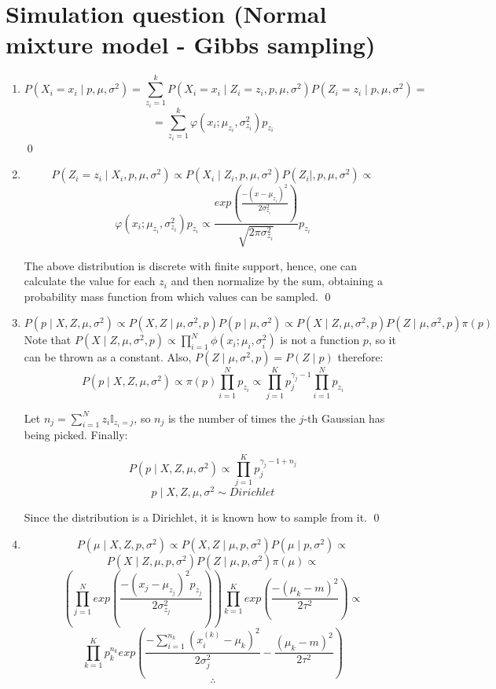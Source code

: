 \documentclass[12pt,letterpaper]{article}
\begin{document}
\newpage
\section*{Simulation question (Normal mixture model - Gibbs sampling)}
\begin{enumerate}[leftmargin=!,labelindent=5pt]
\item  
$$
P(X_i = x_i \mid p,\mu, \sigma^2) =
\sum_{z_i = 1}^{k}P(X_i = x_i \mid Z_i = z_i, p, \mu, \sigma^2)
P(Z_i = z_i \mid p,\mu, \sigma^2) = 
$$
$$ = 
\sum_{z_i = 1}^{k}\varphi(x_i; \mu_{z_i}, \sigma^2_{z_i})p_{z_i}
$$
\qed

\item 

$$
P(Z_i = z_i \mid X_i, p, \mu, \sigma^2) \propto
P(X_i \mid Z_i, p, \mu, \sigma^2)P(Z_i \mid, p, \mu, \sigma^2)
\propto
$$
$$
\varphi(x_i; \mu_{z_i},\sigma^2_{z_i}) p_{z_i} \propto
\frac{exp \left(
\frac{-(x-\mu_{z_i})^2}{2\sigma^2_{z_i}}
\right)}{\sqrt{2\pi\sigma^2_{z_i}}} p_{z_i}
$$

The above distribution is discrete with finite support, hence,
one can calculate the value for each $z_i$ and then normalize
by the sum, obtaining a probability mass function from which
values can be sampled.
\qed

\item
$$
P(p \mid X, Z, \mu, \sigma^2) \propto
P(X,Z \mid \mu, \sigma^2, p) P(p \mid \mu, \sigma^2) \propto
P(X \mid Z, \mu, \sigma^2, p)P(Z \mid \mu, \sigma^2, p)\pi(p)
$$
Note that
$P(X \mid Z, \mu, \sigma^2, p) \propto
\prod_{i=1}^N\phi(x_i;\mu_i,\sigma^2_i)$ is not a function
$p$, so it can be thrown as a constant. Also, 
$P(Z \mid \mu, \sigma^2, p) = P(Z \mid p)$
therefore:
$$
P(p \mid X, Z, \mu, \sigma^2) \propto
\pi(p) \prod_{i=1}^N p_{z_i} \propto
\prod_{j=1}^K p_j^{\gamma_j -1}\prod_{i=1}^N p_{z_i} 
$$

Let $n_j = \sum_{i=1}^N z_i \mathbb I_{z_i = j}$, so $n_j$ is
the number of times the $j$-th Gaussian has being picked. Finally:

$$
P(p \mid X, Z, \mu, \sigma^2) \propto
\prod_{j=1}^K p_j^{\gamma_j -1 + n_j} 
$$
$$
p \mid X, Z, \mu, \sigma^2 \sim Dirichlet
$$

Since the distribution is a Dirichlet, it is known how to
sample from it.
\qed

\item
$$
P(\mu \mid X, Z, p, \sigma^2) \propto
P(X,Z \mid \mu, p, \sigma^2)P(\mu \mid p, \sigma^2) \propto
$$
$$
P(X \mid Z, \mu, p, \sigma^2)P(Z \mid \mu, p, \sigma^2)\pi(\mu) \propto
$$
$$
\left(
\prod_{j=1}^N exp \left(
	\frac{-(x_j - \mu_{z_j})^2 p_{z_j}}{2\sigma^2_{z_j}}
	\right)
\right)
\prod_{k=1}^K exp \left(
	\frac{-(\mu_k - m)^2}{2\tau^2}
\right) \propto
$$
$$
\prod_{k=1}^K
p_k^{n_k}
exp \left(
	\frac{-\sum_{i=1}^{n_k}(x_i^{(k)} - \mu_k)^2}{2\sigma_j^2} -
	\frac{(\mu_k - m)^2}{2\tau^2}
\right)
$$
$$\therefore$$


\end{enumerate}
\end{document}
